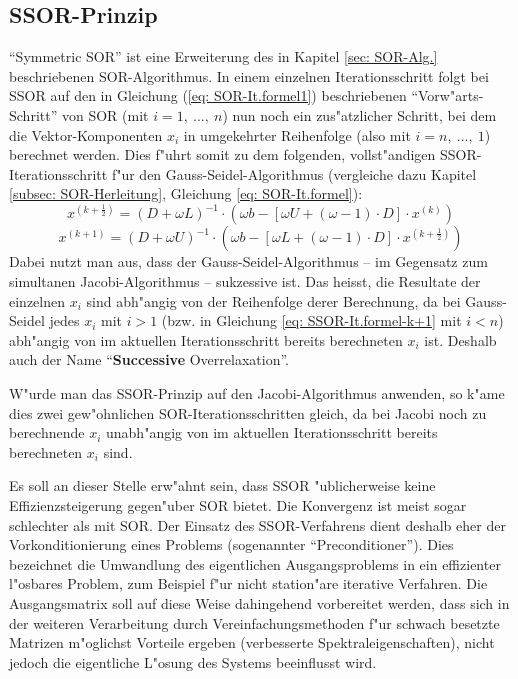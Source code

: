 \begin{refsection}
\section{SSOR-Prinzip}
``Symmetric SOR'' ist eine Erweiterung des in Kapitel \ref{sec: SOR-Alg.}
beschriebenen SOR-Algorithmus. In einem einzelnen Iterationsschritt
folgt bei SSOR auf den in Gleichung (\ref{eq: SOR-It.formel1})
beschriebenen ``Vorw"arts-Schritt'' von SOR (mit $i=1,\ ...,\ n$) nun
noch ein zus"atzlicher Schritt, bei dem die Vektor-Komponenten $x_i$ in
umgekehrter Reihenfolge (also mit $i=n,\ ...,\ 1$) berechnet werden. Dies
f"uhrt somit zu dem folgenden, vollst"andigen SSOR-Iterationsschritt
f"ur den Gauss-Seidel-Algorithmus (vergleiche dazu Kapitel \ref{subsec:
SOR-Herleitung}, Gleichung \ref{eq: SOR-It.formel}):
\begin{equation} \label{eq: SSOR-It.formel-k+1/2}
	x^{(k+\frac{1}{2})}=(D+\omega L)^{-1}\cdot(\omega b-[\omega U+(\omega-1)\cdot D]\cdot x^{(k)})
\end{equation}
\begin{equation} \label{eq: SSOR-It.formel-k+1}
	x^{(k+1)}=(D+\omega U)^{-1}\cdot(\omega b-[\omega L+(\omega-1)\cdot D]\cdot x^{(k+\frac{1}{2})})
\end{equation}
Dabei nutzt man aus, dass der Gauss-Seidel-Algorithmus -- im Gegensatz
zum simultanen Jacobi-Algorithmus -- sukzessive ist. Das heisst, die
Resultate der einzelnen $x_i$ sind abh"angig von der Reihenfolge derer
Berechnung, da bei Gauss-Seidel jedes $x_i$ mit $i>1$ (bzw. in Gleichung
\ref{eq: SSOR-It.formel-k+1} mit $i<n$) abh"angig von im aktuellen
Iterationsschritt bereits berechneten $x_i$ ist. Deshalb auch der Name
``\textbf{Successive} Overrelaxation''.

W"urde man das SSOR-Prinzip auf den Jacobi-Algorithmus anwenden, so k"ame
dies zwei gew"ohnlichen SOR-Iterationsschritten gleich, da bei Jacobi
noch zu berechnende $x_i$ unabh"angig von im aktuellen Iterationsschritt
bereits berechneten $x_i$ sind.

Es soll an dieser Stelle erw"ahnt sein, dass SSOR "ublicherweise keine
Effizienzsteigerung gegen"uber SOR bietet. Die Konvergenz ist meist sogar
schlechter als mit SOR. Der Einsatz des SSOR-Verfahrens dient deshalb
eher der Vorkonditionierung \cite{Vorkonditionierung_Dorn} eines Problems
(sogenannter ``Preconditioner''). Dies bezeichnet die Umwandlung des
eigentlichen Ausgangsproblems in ein effizienter l"osbares Problem, zum
Beispiel f"ur nicht station"are iterative Verfahren. Die Ausgangsmatrix
soll auf diese Weise dahingehend vorbereitet werden, dass sich in der
weiteren Verarbeitung durch Vereinfachungsmethoden f"ur schwach besetzte
Matrizen m"oglichst Vorteile ergeben (verbesserte Spektraleigenschaften),
nicht jedoch die eigentliche L"osung des Systems beeinflusst wird.

\printbibliography[heading=subbibliography]
\end{refsection}
